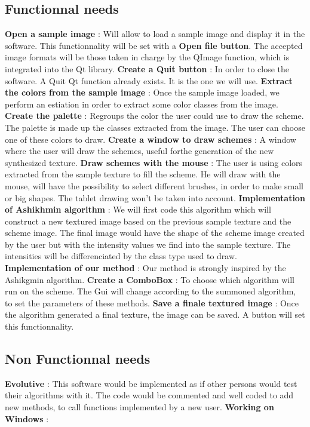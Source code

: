 \documentclass[12pt]{article}
\begin{document}
\subsection{Functionnal needs}
\medbreak
\textbf{Open a sample image} : Will allow to load a sample image and display it in the software. This functionnality will be set with a \textbf{Open file button}. The accepted image formats will be those taken in charge by the QImage function, which is integrated into the Qt library.
\medbreak
\textbf{Create a Quit button} : In order to close the software. A Quit Qt function already exists. It is the one we will use. 
\medbreak
\textbf{Extract the colors from the sample image} : Once the sample image loaded, we perform an estiation in order to extract some color classes from the image.
\medbreak
\textbf{Create the palette} : Regroups the color the user could use to draw the scheme. The palette is made up the classes extracted from the image. The user can choose one of these colors to draw.
\medbreak
\textbf{Create a window to draw schemes} : A window where the user will draw the schemes, useful forthe generation of the new synthesized texture.
\medbreak
\textbf{Draw schemes with the mouse} : The user is using colors extracted from the sample texture to fill the scheme. He will draw with the mouse, will have the possibility to select different brushes, in order to make small or big shapes. The tablet drawing won't be taken into account.
\medbreak
\textbf{Implementation of Ashikhmin algorithm} : We will first code this algorithm which will construct a new textured image based on the previous sample texture and the scheme image. The final image would have the shape of the scheme image created by the user but with the intensity values we find into the sample texture. The intensities will be differenciated by the class type used to draw.
\medbreak
\textbf{Implementation of our method} : Our method is strongly inspired by the Ashikgmin algorithm.
\medbreak
\textbf{Create a ComboBox} : To choose which algorithm will run on the scheme. The Gui will change according to the summoned algorithm, to set the parameters of these methods.  
\medbreak
\textbf{Save a finale textured image} : Once the algorithm generated a final texture, the image can be saved. A button will set this functionnality.
\medbreak
\subsection{Non Functionnal needs}
\medbreak
\textbf{Evolutive} : This software would be implemented as if other persons would test their algorithms with it. The code would be commented and well coded to add new methods, to call functions implemented by a new user.
\medbreak
\textbf{Working on Windows} : 
\medbreak
\end{document}
